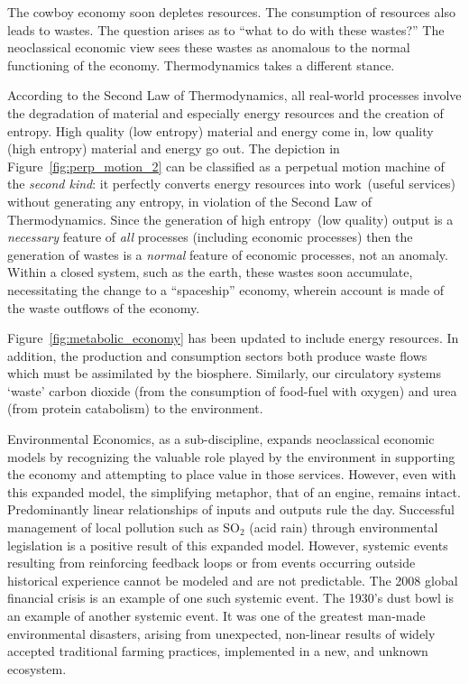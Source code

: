 The cowboy economy soon depletes resources.
The consumption of resources also leads to wastes.
The question arises as to ``what to do with these wastes?''
The neoclassical economic view sees these wastes as
anomalous to the normal functioning of the economy.\cite{Ayres1969}
Thermodynamics takes a different stance.

According to the Second Law of Thermodynamics,
all real-world processes involve the degradation
of material and especially energy resources
and the creation of entropy.
High quality (low entropy) material and energy come in,
low quality (high entropy) material and energy go out.
The depiction in Figure~\ref{fig:perp_motion_2} 
can be classified as a perpetual motion machine
of the \emph{second kind}:
it perfectly converts energy resources into 
work~(useful services) without generating
any entropy,
in violation of the Second Law of Thermodynamics.
Since the generation of high entropy~(low quality)
output is a \emph{necessary} feature of \emph{all} processes 
(including economic processes)
then the generation of wastes is a \emph{normal} feature of
economic processes,
not an anomaly.
Within a closed system, such as the earth,
these wastes soon accumulate,
necessitating the change to a ``spaceship'' economy,
wherein account is made of the waste outflows of
the economy.

Figure~\ref{fig:metabolic_economy} has been updated
to include energy resources.
In addition,
the production and consumption sectors both produce
waste flows which must be assimilated by the biosphere.
Similarly, our circulatory systems `waste' carbon dioxide
(from the consumption of food-fuel with oxygen)
and urea (from protein catabolism) to the environment.

Environmental Economics, as a sub-discipline, 
expands neoclassical economic models by recognizing the
valuable role played by the environment in supporting the 
economy and attempting to place value in those services.
However, even with this expanded model, 
the simplifying metaphor,
that of an engine,
remains intact. 
Predominantly linear relationships of inputs and outputs rule the day. 
Successful management of  local pollution such as SO$_2$
(acid rain) 
through environmental legislation
is a positive result of this expanded model.
However, systemic events resulting from reinforcing feedback loops 
or from events occurring outside historical experience 
cannot be modeled and are not predictable. 
The 2008 global financial crisis is an example of one such systemic event.\cite{Economist2010}
The 1930's dust bowl is an example of another systemic event. 
It was one of the greatest man-made environmental disasters, 
arising from unexpected, non-linear 
results of widely accepted traditional farming practices, 
implemented in a new, and unknown ecosystem.\cite{Lockertz1978} 


